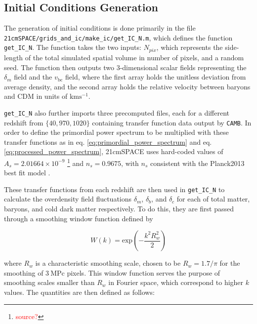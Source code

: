 \documentclass[floats,floatfix,showpacs,amssymb,prd,superscriptaddress,nofootinbib]{revtex4-2} %
\newcommand{\code}{\texttt}
\newcommand{\red}{\textcolor{red}}
\begin{document}
\subsection{Initial Conditions Generation}

The generation of initial conditions is done primarily in the file \code{21cmSPACE/grids\_and\_ic/make\_ic/get\_IC\_N.m}, which defines the function \code{get\_IC\_N}. The function takes the two inputs: $N_{pix}$, which represents the side-length of the total simulated spatial volume in number of pixels, and a random seed. The function then outputs two 3-dimensional scalar fields representing the $\delta_m$ field and the $v_{\text{bc}}$ field, where the first array holds the unitless deviation from average density, and the second array holds the relative velocity between baryons and CDM in units of $\text{km} \text{s}^{-1}$. 

\code{get\_IC\_N} also further imports three precomputed files, each for a different redshift from $\{40, 970, 1020\}$ containing transfer function data output by \code{CAMB}. In order to define the primordial power spectrum to be multiplied with these transfer functions as in eq. \ref{eq:primordial_power_spectrum} and eq. \ref{eq:processed_power_spectrum}, 21cmSPACE uses hard-coded values of $A_s = 2.01664 \times 10^{-9}$ \footnote{\red{source?}} and $n_s = 0.9675$, with $n_s$ consistent with the Planck2013 best fit model \citep{Planck2013results}. 

These transfer functions from each redshift are then used in \code{get\_IC\_N} to calculate the overdensity field fluctuations $\delta_m$, $\delta_b$, and $\delta_c$ for each of total matter, baryons, and cold dark matter respectively. To do this, they are first passed through a smoothing window function defined by 

\begin{equation}
    W(k) = \text{exp}\left( -\frac{k^2 R_w ^2}{2} \right)
\end{equation}

\noindent where $R_w$ is a characteristic smoothing scale, chosen to be $R_w = 1.7 / \pi$ for the smoothing of $3 ~\text{MPc}$ pixels.
This window function serves the purpose of smoothing scales smaller than $R_w$ in Fourier space, which correspond to higher $k$ values. The quantities are then defined as follows:
\end{document}
